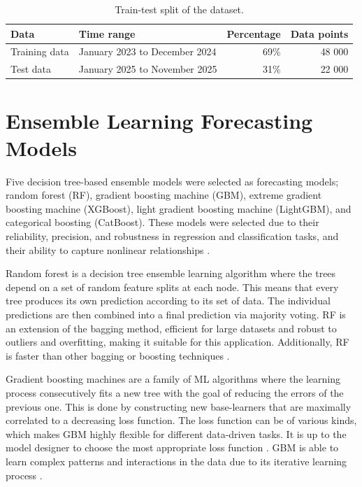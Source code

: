 \begin{table}[h!tbp]%
    \centering
    \caption{Train-test split of the dataset.}
    \label{tab:train-test-split}
    \small
    \begin{tabularx}{\linewidth}{l l r r}
        \textbf{Data} & \textbf{Time range}           & \textbf{Percentage} & \textbf{Data points} \\
        \midrule
        Training data & January 2023 to December 2024 & 69\%                & 48 000               \\
        Test data     & January 2025 to November 2025 & 31\%                & 22 000               \\
    \end{tabularx}
\end{table}

\section{Ensemble Learning Forecasting Models}

Five decision tree-based ensemble models were selected as forecasting models; random forest (RF), gradient boosting machine (GBM), extreme gradient boosting machine (XGBoost), light gradient boosting machine (LightGBM), and categorical boosting (CatBoost). These models were selected due to their reliability, precision, and robustness in regression and classification tasks, and their ability to capture nonlinear relationships \cite{moon_advancing_2024}.

Random forest is a decision tree ensemble learning algorithm where the trees depend on a set of random feature splits at each node. This means that every tree produces its own prediction according to its set of data. The individual predictions are then combined into a final prediction via majority voting. RF is an extension of the bagging method, efficient for large datasets and robust to outliers and overfitting, making it suitable for this application. Additionally, RF is faster than other bagging or boosting techniques \cite{breiman_random_2001}.

Gradient boosting machines are a family of ML algorithms where the learning process consecutively fits a new tree with the goal of reducing the errors of the previous one. This is done by constructing new base-learners that are maximally correlated to a decreasing loss function. The loss function can be of various kinds, which makes GBM highly flexible for different data-driven tasks. It is up to the model designer to choose the most appropriate loss function \cite{natekin_gradient_2013}. GBM is able to learn complex patterns and interactions in the data due to its iterative learning process \cite{moon_advancing_2024}.

